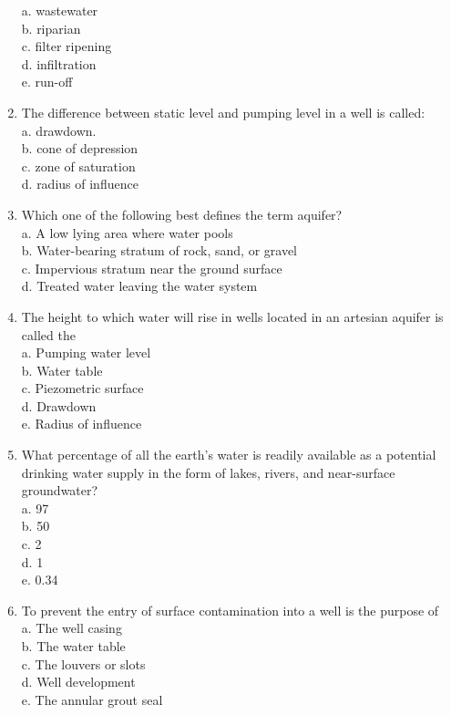 \begin{enumerate}[1.]
a. wastewater\\
b. riparian\\
c. filter ripening\\
d. infiltration\\
e. run-off\\
\item The difference between static level and pumping level in a well is called:\\
a. drawdown.\\
b. cone of depression\\
c. zone of saturation\\
d. radius of influence\\
\item Which one of the following best defines the term aquifer?\\
 a. A low lying area where water pools\\
 b. Water-bearing stratum of rock, sand, or gravel\\
 c. Impervious stratum near the ground surface\\
 d. Treated water leaving the water system\\
 \item The height to which water will rise in wells located in an artesian aquifer is called the\\
 a. Pumping water level\\
 b. Water table\\
 c. Piezometric surface\\
 d. Drawdown\\
 e. Radius of influence\\
 \item What percentage of all the earth's water is readily available as a potential drinking water supply in the form of lakes, rivers, and near-surface groundwater?\\
 a. 97\\
 b. 50\\
 c. 2\\
 d. 1\\
 e. 0.34\\
 \item To prevent the entry of surface contamination into a well is the purpose of\\
 a. The well casing\\
 b. The water table\\
 c. The louvers or slots\\
 d. Well development\\
 e. The annular grout seal\\

\end{enumerate}
